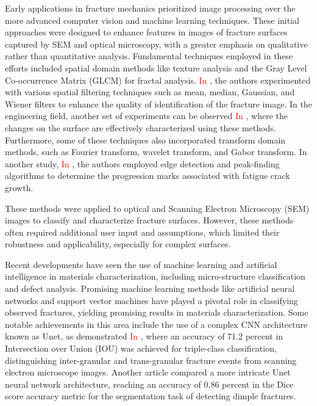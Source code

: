 \documentclass[preprint,12pt]{elsarticle}
\begin{document}
    Early applications in fracture mechanics prioritized image processing over the more advanced computer vision and machine learning techniques.
    These initial approaches were designed to enhance features in images of fracture surfaces captured by SEM and optical microscopy, with a greater emphasis on qualitative rather than quantitative analysis.
    Fundamental techniques employed in these efforts included spatial domain methods like texture analysis and the Gray Level Co-occurrence Matrix (GLCM) for fractal analysis.
    \textcolor{red}{In \cite{zain2009enhancement}}, the authors experimented with various spatial filtering techniques such as mean, median, Gaussian, and Wiener filters to enhance the quality of identification of the fracture image.
    In the engineering field, another set of experiments can be observed \textcolor{red}{In \cite{das2011characterization}}, where the changes on the surface are effectively characterized using these methods.
    Furthermore, some of these techniques also incorporated transform domain methods, such as Fourier transform, wavelet transform, and Gabor transform.
    In another study, \textcolor{red}{In \cite{hu2017automation}}, the authors employed edge detection and peak-finding algorithms to determine the progression marks associated with fatigue crack growth.

    These methods were applied to optical and Scanning Electron Microscopy (SEM) images to classify and characterize fracture surfaces.
    However, these methods often required additional user input and assumptions, which limited their robustness and applicability, especially for complex surfaces.

    Recent developments have seen the use of machine learning and artificial intelligence in materials characterization, including micro-structure classification and defect analysis.
    Promising machine learning methods like artificial neural networks and support vector machines have played a pivotal role in classifying observed fractures, yielding promising results in materials characterization.
    Some notable achievements in this area include the use of a complex CNN architecture known as Unet,
    as demonstrated \textcolor{red}{In \cite{tsopanidis2020toward}}, where an accuracy of 71.2 percent in Intersection over Union (IOU) was achieved for triple-class classification,
    distinguishing inter-granular and trans-granular fracture events from scanning electron microscope images.
    Another article compared a more intricate Unet neural network architecture, reaching an accuracy of 0.86 percent in the Dice score accuracy metric for the segmentation task of detecting dimple fractures.
\end{document}
